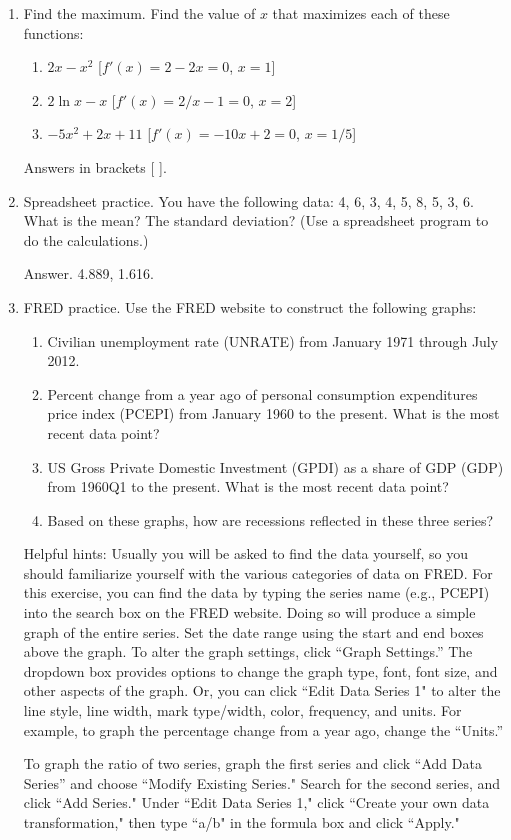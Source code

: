 \begin{enumerate}
\item Find the maximum.  Find the value of $x$ that maximizes each of these functions:
\begin{enumerate}
\item $2x-x^2$  [$f'(x) = 2-2x = 0$, $x = 1$]
\item $2 \ln x - x$ [$f'(x) = 2/x-1 = 0$, $x = 2$]
\item $-5x^2  +2x + 11$  [$f'(x) = -10x+2 = 0$, $x = 1/5$]
\end{enumerate}
Answers in brackets [ ].

\item Spreadsheet practice. You have the following data:
4, 6, 3, 4, 5, 8, 5, 3, 6.
What is the mean?  The standard deviation?
(Use a spreadsheet program to do the calculations.)

Answer.  4.889, 1.616.


\item FRED practice. Use the FRED website to construct the following graphs:
\begin{enumerate}
\item Civilian unemployment rate (UNRATE) from January 1971 through July 2012.
\item Percent change from a year ago of personal consumption expenditures price index (PCEPI) from January 1960 to the present.  What is the most recent data point?
\item US Gross Private Domestic Investment (GPDI) as a share of GDP (GDP) from 1960Q1 to the present.
What is the most recent data point?
\item Based on these graphs, how are recessions reflected in these three series?
\end{enumerate}
Helpful hints: Usually you will be asked to find the data yourself, so you should familiarize yourself with the various categories of data on FRED. For this exercise, you can find the data by typing the series name (e.g., PCEPI) into the search box on the FRED website. Doing so will produce a simple graph of the entire series.  Set the date range using the start and end boxes above the graph.  To alter the graph settings, click ``Graph Settings.'' The dropdown box provides options to change the graph type, font, font size, and other aspects of the graph.  Or, you can click ``Edit Data Series 1" to alter the line style, line width, mark type/width, color, frequency, and units. For example, to graph the percentage change from a year ago, change the ``Units.''

To graph the ratio of two series, graph the first series and click ``Add Data Series'' and  choose ``Modify Existing Series."  Search for the second series, and click  ``Add Series." Under ``Edit Data Series 1," click ``Create your own data transformation," then type ``a/b" in the formula box and click ``Apply."




\end{enumerate}
